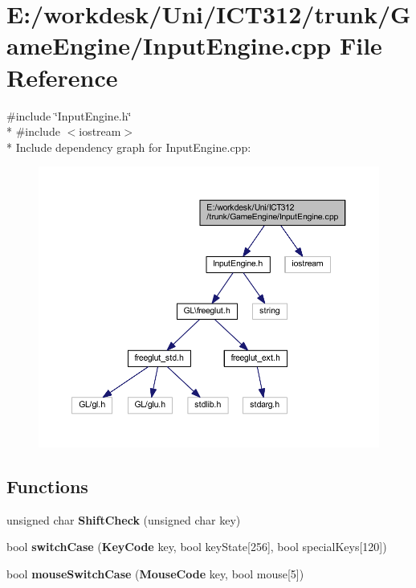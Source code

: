\section{E\+:/workdesk/\+Uni/\+I\+C\+T312/trunk/\+Game\+Engine/\+Input\+Engine.cpp File Reference}
\label{_input_engine_8cpp}
{\ttfamily \#include \char`\"{}Input\+Engine.\+h\char`\"{}}\\*
{\ttfamily \#include $<$iostream$>$}\\*
Include dependency graph for Input\+Engine.\+cpp\+:\nopagebreak
\begin{figure}[H]
\begin{center}
\leavevmode
\includegraphics[width=350pt]{d5/dc2/_input_engine_8cpp__incl}
\end{center}
\end{figure}
\subsection*{Functions}
\begin{DoxyCompactItemize}
\item 
unsigned char {\bf Shift\+Check} (unsigned char key)
\item 
bool {\bf switch\+Case} ({\bf Key\+Code} key, bool key\+State[256], bool special\+Keys[120])
\item 
bool {\bf mouse\+Switch\+Case} ({\bf Mouse\+Code} key, bool mouse[5])
\end{DoxyCompactItemize}


